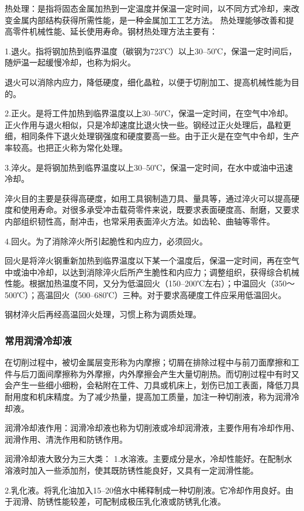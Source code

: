 \documentclass{ctexbook}
\begin{document}
热处理：是指将固态金属加热到一定温度并保温一定时间，以不同方式冷却，来改变金属内部结构获得所需性能，是一种金属加工工艺方法。
热处理能够改善和提高零件机械性能、延长使用寿命。钢材热处理方法主要有：

1.退火。指将钢加热到临界温度（碳钢为723℃）以上30--50℃，保温一定时间后，随炉温一起缓慢冷却，也称为焖火。

退火可以消除内应力，降低硬度，细化晶粒，以便于切削加工、提高机械性能为目的。

2.正火。是将工件加热到临界温度以上30--50℃，保温一定时间，在空气中冷却。正火作用与退火相似，只是冷却速度比退火快一些。钢经过正火处理后，晶粒更细，相同条件下退火处理钢强度和硬度要高一些。由于正火是在空气中令却，生产率较高。也把正火称为常化处理。

3.淬火。是将钢加热到临界温度以上30--50℃，保温一定时间，在水中或油中迅速冷却。

淬火目的主要是获得高硬度，如用工具钢制造刀具、量具等，通过淬火可以提高硬度和使用寿命。对很多承受冲击载荷零件来说，既要求表面硬度高、耐磨，又要求内部组织韧性高，耐冲击，也常采用表面淬火方法。如齿轮、曲轴等零件。

4.回火。为了消除淬火所引起脆性和内应力，必须回火。

回火是将淬火钢重新加热到临界温度以下某一个温度后，保温一定时间，再在空气中或油中冷却，以达到消除淬火后所产生脆性和内应力；调整组织，获得综合机械性能。根据加热温度不同，又分为低温回火（150--200℃左右）；中温回火（350〜500℃）；高温回火（500--680℃）三种。对于要求高硬度工件应采用低温回火。

钢材淬火后再经高温回火处理，习惯上称为调质处理。
\subsubsection{常用润滑冷却液}
在切削过程中，被切金属层变形称为内摩擦；切屑在排除过程中与前刀面摩擦和工件与后刀面间摩擦称为外摩擦，内外摩擦会产生大量切削热。而切削过程中有时又会产生一些细小细粉，会粘附在工件、刀具或机床上，划伤已加工表面，降低刀具耐用度和机床精度。为了减少热量，提高加工质量，加注一种切削液，称为润滑冷却液。

润滑冷却液作用：润滑冷却液也称为切削液或冷却润滑液，主要作用有冷却作用、润滑作用、清洗作用和防锈作用。

润滑冷却液大致分为三大类：
1.水溶液。主要成分是水，冷却性能好。在配制水溶液时加入一些添加剂，使其既防锈性能良好，又具有一定润滑性能。

2.乳化液。将乳化油加入15--20倍水中稀释制成一种切削液。它冷却作用良好。由于润滑、防锈性能较差，可配制成极压乳化液或防锈乳化液。
\end{document}
